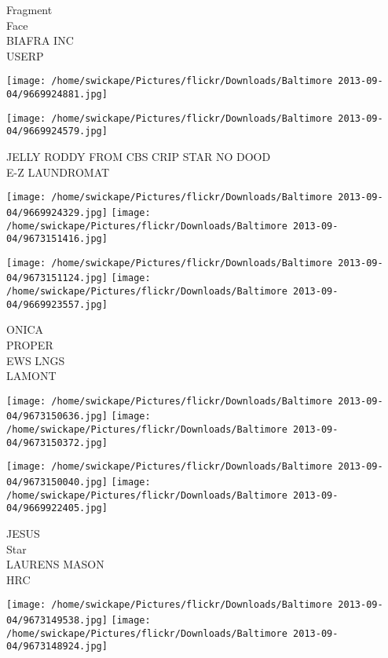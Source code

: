 \documentclass[10pt,letterpaper]{article}
\begin{document}
Fragment\\
Face\\
BIAFRA INC\\
USERP\\
\pagebreak

\texttt{[image: /home/swickape/Pictures/flickr/Downloads/Baltimore 2013-09-04/9669924881.jpg]}

\vspace{0.25in}
\texttt{[image: /home/swickape/Pictures/flickr/Downloads/Baltimore 2013-09-04/9669924579.jpg]}

JELLY RODDY FROM CBS CRIP STAR NO DOOD\\
E{-}Z LAUNDROMAT\\
\pagebreak

\texttt{[image: /home/swickape/Pictures/flickr/Downloads/Baltimore 2013-09-04/9669924329.jpg]}
\texttt{[image: /home/swickape/Pictures/flickr/Downloads/Baltimore 2013-09-04/9673151416.jpg]}

\texttt{[image: /home/swickape/Pictures/flickr/Downloads/Baltimore 2013-09-04/9673151124.jpg]}
\texttt{[image: /home/swickape/Pictures/flickr/Downloads/Baltimore 2013-09-04/9669923557.jpg]}

ONICA\\
PROPER\\
EWS LNGS\\
LAMONT\\
\pagebreak

\texttt{[image: /home/swickape/Pictures/flickr/Downloads/Baltimore 2013-09-04/9673150636.jpg]}
\texttt{[image: /home/swickape/Pictures/flickr/Downloads/Baltimore 2013-09-04/9673150372.jpg]}

\texttt{[image: /home/swickape/Pictures/flickr/Downloads/Baltimore 2013-09-04/9673150040.jpg]}
\texttt{[image: /home/swickape/Pictures/flickr/Downloads/Baltimore 2013-09-04/9669922405.jpg]}

JESUS\\
Star\\
LAURENS MASON\\
HRC\\
\pagebreak

\texttt{[image: /home/swickape/Pictures/flickr/Downloads/Baltimore 2013-09-04/9673149538.jpg]}
\texttt{[image: /home/swickape/Pictures/flickr/Downloads/Baltimore 2013-09-04/9673148924.jpg]}
\end{document}
